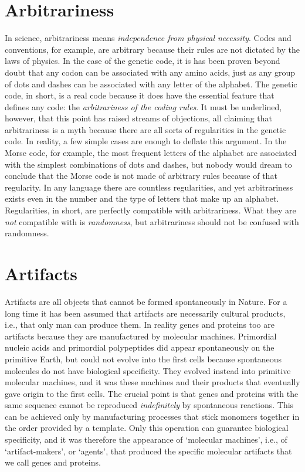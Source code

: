 \documentclass[12pt]{article}
\begin{document}
\section{Arbitrariness}
In science, arbitrariness means \textit{independence from physical necessity}. Codes and conventions, for example, are arbitrary because their rules are not dictated by the laws of physics. In the case of the genetic code, it is has been proven beyond doubt that any codon can be associated with any amino acids, just as any group of dots and dashes can be associated with any letter of the alphabet. The genetic code, in short, is a real code because it does have the essential feature that defines any code: the \textit{arbitrariness of the coding rules}. It must be underlined, however, that this point has raised streams of objections, all claiming that arbitrariness is a myth because there are all sorts of regularities in the genetic code. In reality, a few simple cases are enough to deflate this argument. In the Morse code, for example, the most frequent letters of the alphabet are associated with the simplest combinations of dots and dashes, but nobody would dream to conclude that the Morse code is not made of arbitrary rules because of that regularity. In any language there are countless regularities, and yet arbitrariness exists even in the number and the type of letters that make up an alphabet. Regularities, in short, are perfectly compatible with arbitrariness. What they are \textit{not} compatible with is \textit{randomness}, but arbitrariness should not be confused with randomness.


\section{Artifacts}
Artifacts are all objects that cannot be formed spontaneously in Nature. For a long time it has been assumed that artifacts are necessarily cultural products, i.e., that only man can produce them. In reality genes and proteins too are artifacts because they are manufactured by molecular machines. Primordial nucleic acids and primordial polypeptides did appear spontaneously on the primitive Earth, but could not evolve into the first cells because spontaneous molecules do not have biological specificity. They evolved instead into primitive molecular machines, and it was these machines and their products that eventually gave origin to the first cells. The crucial point is that genes and proteins with the same sequence cannot be reproduced \textit{indefinitely} by spontaneous reactions. This can be achieved only by manufacturing processes that stick monomers together in the order provided by a template. Only this operation can guarantee biological specificity, and it was therefore the appearance of `molecular machines', i.e., of `artifact-makers', or `agents', that produced the specific molecular artifacts that we call genes and proteins. 
\end{document}
